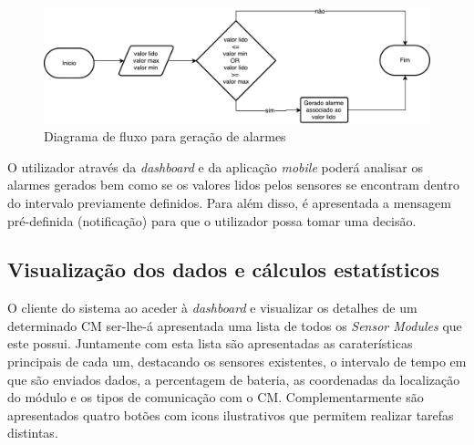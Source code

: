 \begin{figure}[!htb]
	\centering
	\includegraphics[scale=0.5]{esquemas/diagramafluxoalarms.pdf}
	\caption{Diagrama de fluxo para geração de alarmes}
	\label{fluxoSP}
\end{figure}





O utilizador através da \textit{dashboard} e da aplicação \textit{mobile} poderá analisar os alarmes gerados bem como se os valores lidos pelos sensores se encontram dentro do intervalo previamente definidos. Para além disso, é apresentada a mensagem pré-definida (notificação) para que o utilizador possa tomar uma decisão.   



\newpage
\subsection{Visualização dos dados e cálculos estatísticos}

O cliente do sistema ao aceder à \textit{dashboard} e visualizar os detalhes de um determinado \acl{CM} ser-lhe-á apresentada uma lista de todos os \textit{Sensor Modules} que este possui. Juntamente com esta lista são apresentadas as caraterísticas principais de cada um, destacando os sensores existentes, o intervalo de tempo em que são enviados dados, a percentagem de bateria, as coordenadas da localização do módulo e os tipos de comunicação com o \acl{CM}. Complementarmente são apresentados quatro botões com icons ilustrativos que permitem realizar tarefas distintas.  

